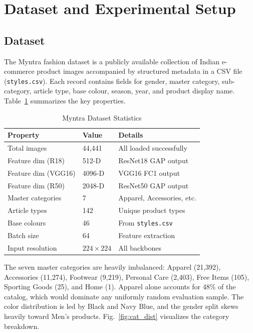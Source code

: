 \documentclass[conference]{IEEEtran}
\begin{document}
\section{Dataset and Experimental Setup}
\label{sec:setup}

\subsection{Dataset}

The Myntra fashion dataset is a publicly available collection of Indian
e-commerce product images accompanied by structured metadata in a CSV
file (\texttt{styles.csv}). Each record contains fields for gender,
master category, sub-category, article type, base colour, season, year,
and product display name. Table~\ref{tab:dataset} summarizes the key
properties.

\begin{table}[!t]
\caption{Myntra Dataset Statistics}
\label{tab:dataset}
\centering
\begin{tabular}{lll}
\toprule
\textbf{Property}  & \textbf{Value}      & \textbf{Details} \\
\midrule
Total images       & 44,441              & All loaded successfully \\
Feature dim (R18)  & 512-D               & ResNet18 GAP output \\
Feature dim (VGG16)& 4096-D              & VGG16 FC1 output \\
Feature dim (R50)  & 2048-D              & ResNet50 GAP output \\
Master categories  & 7                   & Apparel, Accessories, etc. \\
Article types      & 142                 & Unique product types \\
Base colours       & 46                  & From \texttt{styles.csv} \\
Batch size         & 64                  & Feature extraction \\
Input resolution   & $224{\times}224$    & All backbones \\
\bottomrule
\end{tabular}
\end{table}

The seven master categories are heavily imbalanced: Apparel (21,392),
Accessories (11,274), Footwear (9,219), Personal Care (2,403), Free
Items (105), Sporting Goods (25), and Home (1). Apparel alone accounts
for 48\% of the catalog, which would dominate any uniformly random
evaluation sample. The color distribution is led by Black and Navy
Blue, and the gender split skews heavily toward Men's products.
Fig.~\ref{fig:cat_dist} visualizes the category breakdown.
\end{document}
